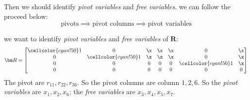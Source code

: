 Then we should identify \emph{pivot variables} and \emph{free variables}. we can follow the proceed below:
\[
\mbox{pivots}
\implies
\mbox{pivot columns}
\implies
\mbox{pivot variables}
\]
\begin{example}
we want to identify \emph{pivot variables} and \emph{free variables} of $\bm R$: 
\[
\bm R = \left[
\begin{array}{@{}ccccccc@{}}
\cellcolor{cyan!50}1&0&\x&\x&\x&0&\x\\
0&\cellcolor{cyan!50}1&\x&\x&\x&0&\x\\
0&0&0&0&0&\cellcolor{cyan!50}1&\x\\
0&0&0&0&0&0&0
\end{array}
\right]
\]
The pivot are $r_{11},r_{22},r_{36}$. So the pivot columns are column $1,2,6$. So the \textit{pivot variables} are $x_1,x_2,x_6$; the \textit{free variables} are $x_3,x_4,x_5,x_7$.
\end{example}
